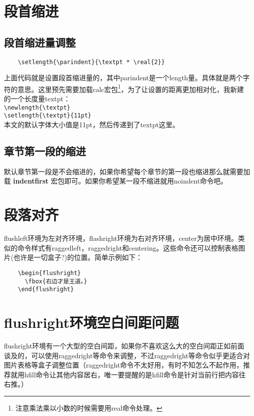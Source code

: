 \documentclass[11pt,oneside]{book}
\begin{document}
  \section{段首缩进}
  \subsection{段首缩进量调整}
  \begin{Verbatim}
    \setlength{\parindent}{\textpt * \real{2}}
  \end{Verbatim}

  上面代码就是设置段首缩进量的，其中parindent是一个length量。具体就是两个字符的意思。这里预先需要加载calc宏包\footnote{注意乘法乘以小数的时候需要用real命令处理。}，为了让设置的距离更加相对化，我新建的一个长度量textpt：\\
  \verb+\newlength{\textpt}+\\
  \verb+\setlength{\textpt}{11pt}+\\
  本文的默认字体大小值是11pt，然后传递到了textpt这里。


  \subsection{章节第一段的缩进}
  默认章节第一段是不会缩进的，如果你希望每个章节的第一段也缩进那么就需要加载 \textbf{indentfirst} 宏包即可。如果你希望某一段不缩进就用noindent命令吧。



  \section{段落对齐}
  flushleft环境为左对齐环境，flashright环境为右对齐环境，center为居中环境。类似的命令样式有raggedleft，raggedright和centering。这些命令还可以控制表格图片(也许是一切盒子?)的位置。简单示例如下：

  \begin{Verbatim}
    \begin{flushright}
      \fbox{右边才是王道。}
    \end{flushright}
  \end{Verbatim}
  \begin{flushright}
  \end{flushright}


  \section{flushright环境空白间距问题}
  flushright环境有一个大型的空白间距，如果你不喜欢这么大的空白间距正如前面谈及的，可以使用raggedright等命令来调整，不过raggedright等命令似乎更适合对图片表格等盒子调整位置（raggedright命令不太好用，有时不知怎么不起作用，推荐就用hfill命令让其他内容居右，唯一要提醒的是hfill命令是针对当前行把内容往右推。）
\end{document}
